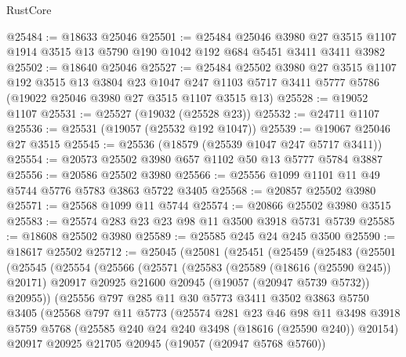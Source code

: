 \begin{lexlean}{RustCore}
\begin{coremodule}
@25484 := @18633 @25046
@25501 := @25484
    @25046
    @3980
    @27
    @3515
    @1107
    @1914
    @3515
    @13
    @5790
    @190
    @1042
    @192
    @684
    @5451
    @3411
    @3411
    @3982
@25502 := @18640 @25046
@25527 := @25484
    @25502
    @3980
    @27
    @3515
    @1107
    @192
    @3515
    @13
    @3804
    @23
    @1047
    @247
    @1103
    @5717
    @3411
    @5777
    @5786
    (@19022 @25046 @3980 @27 @3515 @1107 @3515 @13)
@25528 := @19052 @1107
@25531 := @25527 (@19032 (@25528 @23))
@25532 := @24711 @1107
@25536 := @25531 (@19057 (@25532 @192 @1047))
@25539 := @19067 @25046 @27 @3515
@25545 := @25536 (@18579 (@25539 @1047 @247 @5717 @3411))
@25554 := @20573 @25502 @3980 @657 @1102 @50 @13 @5777 @5784 @3887
@25556 := @20586 @25502 @3980
@25566 := @25556 @1099 @1101 @11 @49 @5744 @5776 @5783 @3863 @5722 @3405
@25568 := @20857 @25502 @3980
@25571 := @25568 @1099 @11 @5744
@25574 := @20866 @25502 @3980 @3515
@25583 := @25574 @283 @23 @23 @98 @11 @3500 @3918 @5731 @5739
@25585 := @18608 @25502 @3980
@25589 := @25585 @245 @24 @245 @3500
@25590 := @18617 @25502
@25712 := @25045
    (@25081
      (@25451
        (@25459
          (@25483
            (@25501
              (@25545
                (@25554
                  (@25566
                    (@25571
                      (@25583
                        (@25589 (@18616 (@25590 @245)) @20171)
                        @20917
                        @20925
                        @21600
                        @20945
                        (@19057 (@20947 @5739 @5732))
                        @20955))
                    (@25556
                      @797
                      @285
                      @11
                      @30
                      @5773
                      @3411
                      @3502
                      @3863
                      @5750
                      @3405
                      (@25568
                        @797
                        @11
                        @5773
                        (@25574
                          @281
                          @23
                          @46
                          @98
                          @11
                          @3498
                          @3918
                          @5759
                          @5768
                          (@25585 @240 @24 @240 @3498 (@18616 (@25590 @240)) @20154)
                          @20917
                          @20925
                          @21705
                          @20945
                          (@19057 (@20947 @5768 @5760))

\end{coremodule}
\end{lexlean}
